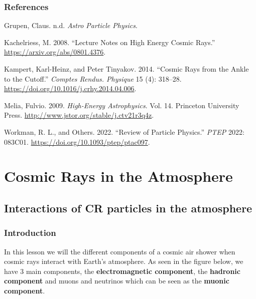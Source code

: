 \documentclass[
  letterpaper,
  DIV=11,
  numbers=noendperiod]{scrreprt}
\newlength{\cslhangindent}
\newenvironment{CSLReferences}[2] %
 {\begin{list}{}{%
  \setlength{\itemindent}{0pt}
  \setlength{\leftmargin}{0pt}
  \setlength{\parsep}{0pt}
  \ifodd #1
   \setlength{\leftmargin}{\cslhangindent}
   \setlength{\itemindent}{-1\cslhangindent}
  \fi
  \setlength{\itemsep}{#2\baselineskip}}}
 {\end{list}}
\begin{document}
\subsection*{References}\label{references-1}

\label{refs}
\begin{CSLReferences}{1}{0}
Grupen, Claus. n.d. \emph{Astro Particle Physics}.

Kachelriess, M. 2008. {``Lecture Notes on High Energy Cosmic Rays.''}
\url{https://arxiv.org/abs/0801.4376}.

Kampert, Karl-Heinz, and Peter Tinyakov. 2014. {``Cosmic Rays from the
Ankle to the Cutoff.''} \emph{Comptes Rendus. Physique} 15 (4): 318--28.
\url{https://doi.org/10.1016/j.crhy.2014.04.006}.

Melia, Fulvio. 2009. \emph{High-Energy Astrophysics}. Vol. 14. Princeton
University Press. \url{http://www.jstor.org/stable/j.ctv21r3q4z}.

Workman, R. L., and Others. 2022. {``{Review of Particle Physics}.''}
\emph{PTEP} 2022: 083C01. \url{https://doi.org/10.1093/ptep/ptac097}.

\end{CSLReferences}


\chapter{Cosmic Rays in the
Atmosphere}\label{cosmic-rays-in-the-atmosphere}

\section{Interactions of CR particles in the
atmosphere}\label{interactions-of-cr-particles-in-the-atmosphere}

\subsection{Introduction}\label{introduction-1}

In this lesson we will the different components of a cosmic air shower
when cosmic rays interact with Earth's atmosphere. As seen in the figure
below, we have 3 main components, the \textbf{electromagnetic
component}, the \textbf{hadronic component} and muons and neutrinos
which can be seen as the \textbf{muonic component}.
\end{document}
